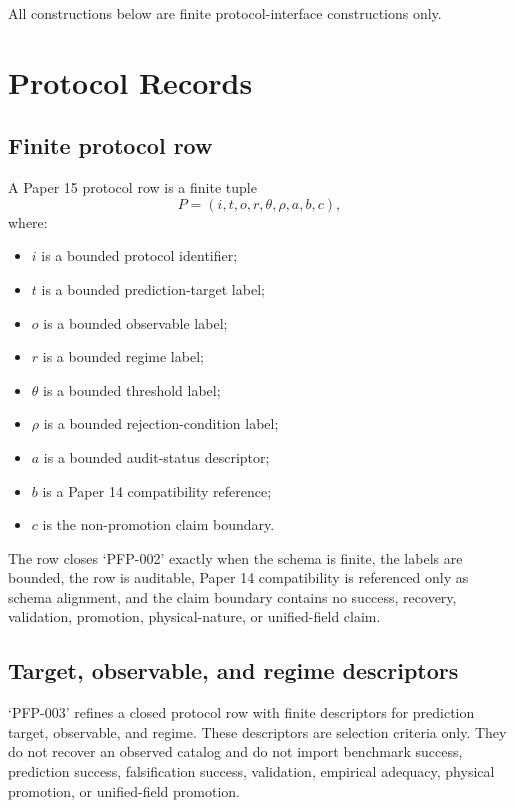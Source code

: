 \documentclass{article}
\begin{document}
All constructions below are finite protocol-interface constructions only.

\section{Protocol Records}

\subsection{Finite protocol row}

A Paper 15 protocol row is a finite tuple
\[
P=(i,t,o,r,\theta,\rho,a,b,c),
\]
where:

\begin{itemize}[leftmargin=*]
\item \(i\) is a bounded protocol identifier;
\item \(t\) is a bounded prediction-target label;
\item \(o\) is a bounded observable label;
\item \(r\) is a bounded regime label;
\item \(\theta\) is a bounded threshold label;
\item \(\rho\) is a bounded rejection-condition label;
\item \(a\) is a bounded audit-status descriptor;
\item \(b\) is a Paper 14 compatibility reference;
\item \(c\) is the non-promotion claim boundary.
\end{itemize}

The row closes `PFP-002' exactly when the schema is finite, the labels are
bounded, the row is auditable, Paper 14 compatibility is referenced only as
schema alignment, and the claim boundary contains no success, recovery,
validation, promotion, physical-nature, or unified-field claim.

\subsection{Target, observable, and regime descriptors}

`PFP-003' refines a closed protocol row with finite descriptors for prediction
target, observable, and regime. These descriptors are selection criteria only.
They do not recover an observed catalog and do not import benchmark success,
prediction success, falsification success, validation, empirical adequacy,
physical promotion, or unified-field promotion.
\end{document}

